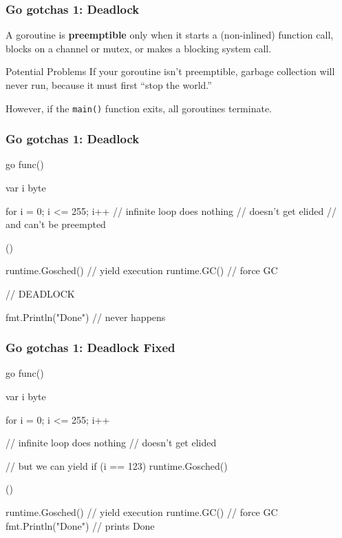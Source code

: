 \documentclass[compress,t,11pt]{beamer}
\begin{document}
\begin{frame}
    \frametitle{Go gotchas 1: Deadlock}
    A goroutine is {\bf preemptible} only when it starts a (non-inlined)
    function call, blocks on a channel or mutex, or makes a blocking system call.
    \vspace{\baselineskip}
\begin{alertblock}{Potential Problems}
    If your goroutine isn't preemptible, garbage collection will never run,
    because it must first ``stop the world.''
\end{alertblock}
    \vspace{\baselineskip}
    However, if the {\tt main()} function exits, all goroutines terminate.
\end{frame}

\begin{frame}[fragile]
    \frametitle{Go gotchas 1: Deadlock}
\begin{golang}
go func() {
    var i byte

    for i = 0; i <= 255; i++ {
        // infinite loop does nothing
        // doesn't get elided
        // and can't be preempted
    }
}()

runtime.Gosched()    // yield execution
runtime.GC()         // force GC

// DEADLOCK

fmt.Println("Done")  // never happens
\end{golang}
\end{frame}

\begin{frame}[fragile]
    \frametitle{Go gotchas 1: Deadlock Fixed}
\begin{golang}
go func() {
    var i byte

    for i = 0; i <= 255; i++ {
        // infinite loop does nothing
        // doesn't get elided

        // but we can yield
		if (i == 123) {
			runtime.Gosched()
		}
    }
}()

runtime.Gosched()    // yield execution
runtime.GC()         // force GC
fmt.Println("Done")  // prints Done
\end{golang}
\end{frame}
\end{document}
